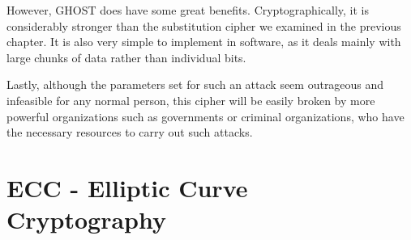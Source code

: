 \documentclass[12pt, a4paper, draft]{report}
\begin{document}
However, GHOST does have some great benefits. Cryptographically, it is considerably
stronger than the substitution cipher we examined in the previous chapter. It is also
very simple to implement in software, as it deals mainly with large chunks of data rather
than individual bits.

Lastly, although the parameters set for such an attack seem outrageous and infeasible
for any normal person, this cipher will be easily broken by more powerful organizations
such as governments or criminal organizations, who have the necessary resources to carry
out such attacks.



\section{ECC - Elliptic Curve Cryptography}
\end{document}
